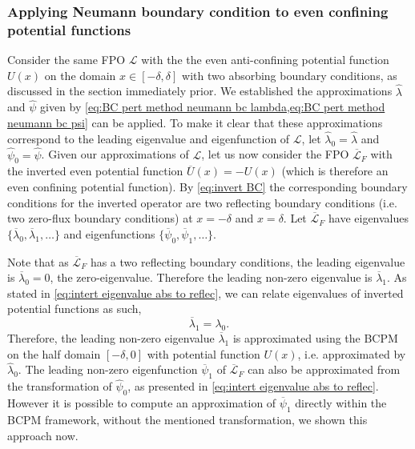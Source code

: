 \documentclass[11pt]{amsart}
\begin{document}
\subsubsection*{Applying Neumann boundary condition to even confining potential functions}
Consider the same FPO $\mathcal{L}$ with the the even anti-confining potential function $U(x)$ on the domain $x\in[-\delta,\delta]$ with two absorbing boundary conditions, as discussed in the section immediately prior. We established the approximations $\hat{\lambda}$ and $\hat{\psi}$ given by \cref{eq:BC pert method neumann bc lambda,eq:BC pert method neumann bc psi} can be applied. To make it clear that these approximations correspond to the leading eigenvalue and eigenfunction of $\mathcal{L}$, let $\hat{\lambda}_0=\hat{\lambda}$ and $\hat{\psi}_0=\hat{\psi}$. Given our approximations of $\mathcal{L}$, let us now consider the FPO $\overline{\mathcal{L}}_{F}$ with the inverted even potential function $\overline{U}(x) = -U(x)$ (which is therefore an even confining potential function). By \cref{eq:invert BC} the corresponding boundary conditions for the inverted operator are two reflecting boundary conditions (i.e. two zero-flux boundary conditions) at $x=-\delta$ and $x=\delta$. Let $\overline{\mathcal{L}}_{F}$ have eigenvalues $\{\overline{\lambda}_0,\overline{\lambda}_1,\dots\}$ and eigenfunctions $\{\overline{\psi}_0,\overline{\psi}_1,\dots\}$.

Note that as $\overline{\mathcal{L}}_{F}$ has a two reflecting boundary conditions, the leading eigenvalue is $\overline{\lambda}_0=0$, the zero-eigenvalue. Therefore the leading non-zero eigenvalue is $\overline{\lambda}_1$. As stated in \cref{eq:intert eigenvalue abs to reflec}, we can relate eigenvalues of inverted potential functions as such,
\begin{equation}
    \label{eq:BC pert method eigenvalue transformation}
   \overline{\lambda}_1=\lambda_0.
\end{equation}
Therefore, the leading non-zero eigenvalue $\overline{\lambda}_1$ is approximated using the BCPM on the half domain $[-\delta,0]$ with potential function $U(x)$, i.e. approximated by $\hat{\lambda}_0$. The leading non-zero eigenfunction $\overline{\psi}_1$ of $\overline{\mathcal{L}}_{F}$ can also be approximated from the transformation of $\hat{\psi}_0$, as presented in \cref{eq:intert eigenvalue abs to reflec}. However it is possible to compute an approximation of $\overline{\psi}_1$ directly within the BCPM framework, without the mentioned transformation, we shown this approach now.
\end{document}
